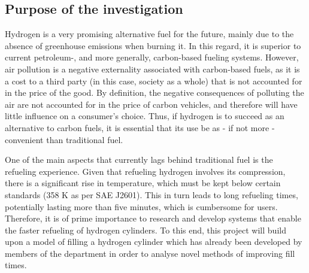 
\subsection{Purpose of the investigation}

Hydrogen is a very promising alternative fuel for the future, mainly due to the absence of greenhouse emissions when burning it. In this regard, it is superior to current petroleum-, and more generally, carbon-based fueling systems.  However, air pollution is a negative externality associated with carbon-based fuels, as it is a cost to a third party (in this case, society as a whole) that is not accounted for in the price of the good. By definition, the negative consequences of polluting the air are not accounted for in the price of carbon vehicles, and therefore will have little influence on a consumer's choice. Thus, if hydrogen is to succeed as an alternative to carbon fuels, it is essential that its use be as - if not more - convenient than traditional fuel.

 One of the main aspects that currently lags behind traditional fuel is the refueling experience. Given that refueling hydrogen involves its compression, there is a significant rise in temperature, which must be kept below certain standards (358 \degree K as per SAE J2601). This in turn leads to long refueling times, potentially lasting more than five minutes, which is cumbersome for users. Therefore, it is of prime importance to research and develop systems that enable the faster refueling of hydrogen cylinders. To this end, this project will build upon a model of filling a hydrogen cylinder which has already been developed by members of the department in order to analyse novel methods of improving fill times.

